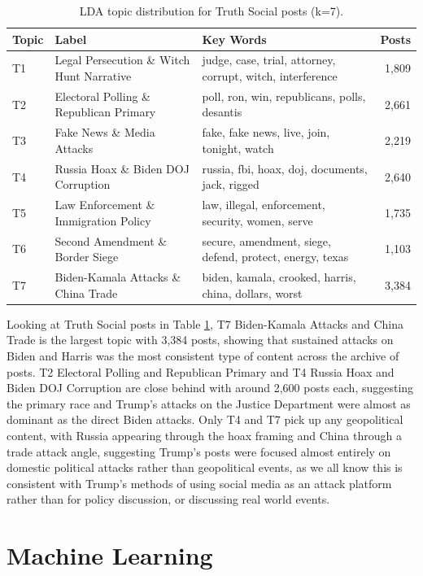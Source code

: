 \documentclass[11pt,a4paper]{article}
\begin{document}
\begin{table}[H]
\centering
\begin{tabular}{llp{6cm}r}
\hline
\textbf{Topic} & \textbf{Label} & \textbf{Key Words} & \textbf{Posts} \\
\hline
T1 & Legal Persecution \& Witch Hunt Narrative & judge, case, trial, attorney, corrupt, witch, interference & 1,809 \\
T2 & Electoral Polling \& Republican Primary & poll, ron, win, republicans, polls, desantis & 2,661 \\
T3 & Fake News \& Media Attacks & fake, fake news, live, join, tonight, watch & 2,219 \\
T4 & Russia Hoax \& Biden DOJ Corruption & russia, fbi, hoax, doj, documents, jack, rigged & 2,640 \\
T5 & Law Enforcement \& Immigration Policy & law, illegal, enforcement, security, women, serve & 1,735 \\
T6 & Second Amendment \& Border Siege & secure, amendment, siege, defend, protect, energy, texas & 1,103 \\
T7 & Biden-Kamala Attacks \& China Trade & biden, kamala, crooked, harris, china, dollars, worst & 3,384 \\
\hline
\end{tabular}
\caption{LDA topic distribution for Truth Social posts (k=7).}
\label{tab:lda_ts}
\end{table}


Looking at Truth Social posts in Table \ref{tab:lda_ts}, T7 Biden-Kamala Attacks and China Trade is the largest topic with 3,384 posts, showing that sustained attacks on Biden and Harris was the most consistent type of content across the archive of posts. T2 Electoral Polling and Republican Primary and T4 Russia Hoax and Biden DOJ Corruption are close behind with around 2,600 posts each, suggesting the primary race and Trump's attacks on the Justice Department were almost as dominant as the direct Biden attacks. Only T4 and T7 pick up any geopolitical content, with Russia appearing through the hoax framing and China through a trade attack angle, suggesting Trump's posts were focused almost entirely on domestic political attacks rather than geopolitical events, as we all know this is consistent with Trump's methods of using social media as an attack platform rather than for policy discussion, or discussing real world events.


\newpage
\section{Machine Learning}
\end{document}
